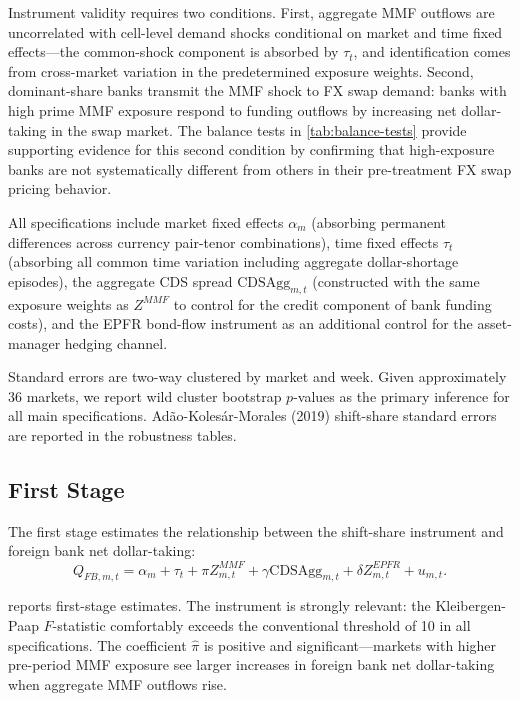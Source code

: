 Instrument validity requires two conditions. First, aggregate MMF outflows
are uncorrelated with cell-level demand shocks conditional on market and time
fixed effects---the common-shock component is absorbed by $\tau_t$, and
identification comes from cross-market variation in the predetermined exposure
weights. Second, dominant-share banks transmit the MMF shock to FX swap demand:
banks with high prime MMF exposure respond to funding outflows by increasing net
dollar-taking in the swap market. The balance tests in \cref{tab:balance-tests}
provide supporting evidence for this second condition by confirming that
high-exposure banks are not systematically different from others in their
pre-treatment FX swap pricing behavior.

All specifications include market fixed effects $\alpha_m$ (absorbing permanent
differences across currency pair-tenor combinations), time fixed effects $\tau_t$
(absorbing all common time variation including aggregate dollar-shortage episodes),
the aggregate CDS spread $\text{CDSAgg}_{m,t}$ (constructed with the same
exposure weights as $Z^{MMF}$ to control for the credit component of bank
funding costs), and the EPFR bond-flow instrument as an additional control for
the asset-manager hedging channel.

Standard errors are two-way clustered by market and week. Given approximately
36 markets, we report wild cluster bootstrap $p$-values as the primary inference
for all main specifications. Adão-Kolesár-Morales (2019) shift-share standard
errors are reported in the robustness tables.

\subsection{First Stage}
\label{subsec:first-stage}

The first stage estimates the relationship between the shift-share instrument and
foreign bank net dollar-taking:
\begin{equation}
  Q_{FB,m,t} = \alpha_m + \tau_t + \pi Z_{m,t}^{MMF} + \gamma
  \text{CDSAgg}_{m,t} + \delta Z_{m,t}^{EPFR} + u_{m,t}.
  \label{eq:first-stage}
\end{equation}

 reports first-stage estimates. The instrument is
strongly relevant: the Kleibergen-Paap $F$-statistic comfortably exceeds the
conventional threshold of 10 in all specifications. The coefficient $\hat\pi$ is
positive and significant---markets with higher pre-period MMF exposure see larger
increases in foreign bank net dollar-taking when aggregate MMF outflows rise.

